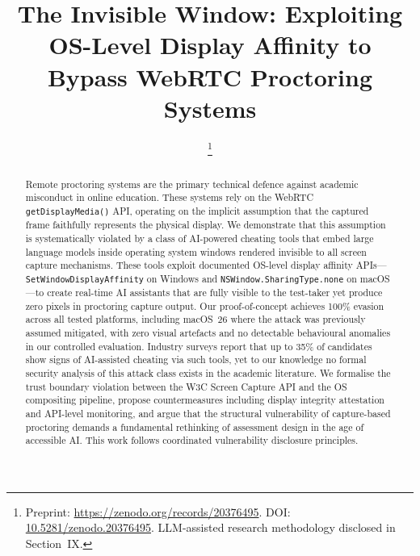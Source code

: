 \documentclass[conference]{IEEEtran}
\begin{document}
\title{The Invisible Window: Exploiting OS-Level Display Affinity to Bypass WebRTC Proctoring Systems}

\author{
\thanks{Preprint: \url{https://zenodo.org/records/20376495}. DOI: \href{https://doi.org/10.5281/zenodo.20376495}{10.5281/zenodo.20376495}. LLM-assisted research methodology disclosed in Section~IX.}}

\maketitle

\begin{abstract}
Remote proctoring systems are the primary technical defence against academic misconduct in online education. These systems rely on the WebRTC \texttt{getDisplayMedia()} API, operating on the implicit assumption that the captured frame faithfully represents the physical display. We demonstrate that this assumption is systematically violated by a class of AI-powered cheating tools that embed large language models inside operating system windows rendered invisible to all screen capture mechanisms. These tools exploit documented OS-level display affinity APIs---\texttt{SetWindowDisplayAffinity} on Windows and \texttt{NSWindow.SharingType.none} on macOS---to create real-time AI assistants that are fully visible to the test-taker yet produce zero pixels in proctoring capture output. Our proof-of-concept achieves 100\% evasion across all tested platforms, including macOS~26 where the attack was previously assumed mitigated, with zero visual artefacts and no detectable behavioural anomalies in our controlled evaluation. Industry surveys report that up to 35\% of candidates show signs of AI-assisted cheating via such tools, yet to our knowledge no formal security analysis of this attack class exists in the academic literature. We formalise the trust boundary violation between the W3C Screen Capture API and the OS compositing pipeline, propose countermeasures including display integrity attestation and API-level monitoring, and argue that the structural vulnerability of capture-based proctoring demands a fundamental rethinking of assessment design in the age of accessible AI. This work follows coordinated vulnerability disclosure principles.
\end{abstract}
\end{document}
